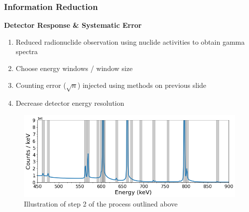 \begin{frame}
  \frametitle{Information Reduction}
  \textbf{\large Detector Response \& Systematic Error} \\
  \medskip
  \begin{enumerate}
    \item Reduced radionuclide observation using nuclide activities to obtain gamma spectra
    \item Choose energy windows / window size
    \item Counting error ($\sqrt{n}$) injected using methods on previous slide
    \item Decrease detector energy resolution
  \end{enumerate}
  \begin{figure}[h!]
    \centering
    \includegraphics[height=0.4\textheight]{./figures/energy_window_example.png}
    \caption{Illustration of step 2 of the process outlined above}
  \end{figure}
\end{frame}
